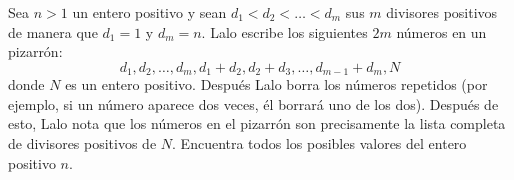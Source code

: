 Sea $n>1$ un entero positivo y sean $d_1\lt d_2\lt \dots\lt d_m$ sus $m$ divisores positivos de manera que $d_1=1$ y $d_m=n$. Lalo escribe los siguientes $2m$ números en un pizarrón:
\[d_1,d_2,\dots,d_m,d_1+d_2,d_2+d_3,\dots,d_{m-1}+d_m,N\]
donde $N$ es un entero positivo. Después Lalo borra los números repetidos (por ejemplo, si un número aparece dos veces, él borrará uno de los dos). Después de esto, Lalo nota que los números en el pizarrón son precisamente la lista completa de divisores positivos de $N$. Encuentra todos los posibles valores del entero positivo $n$.